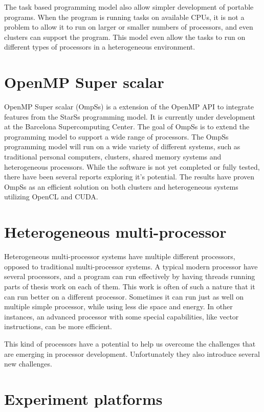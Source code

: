 The task based programming model also allow simpler development of portable programs.
When the program is running tasks on available CPUs, it is not a problem to allow it to run on larger or smaller numbers of processors, and even clusters can support the program.
This model even allow the tasks to run on different types of processors in a heterogeneous environment.

\section[OmpSs]{OpenMP Super scalar}
OpenMP Super scalar (OmpSs) is a extension of the OpenMP API to integrate features from the StarSs programming model.
It is currently under development at the Barcelona Supercomputing Center.
The goal of OmpSs is to extend the programming model to support a wide range of processors.
The OmpSs programming model will run on a wide variety of different systems, such as traditional personal computers, clusters, shared memory systems and heterogeneous processors.
While the software is not yet completed or fully tested, there have been several reports exploring it's potential.
The results have proven OmpSs as an efficient solution on both clusters and heterogeneous systems utilizing OpenCL and CUDA.


\section{Heterogeneous multi-processor}
Heterogeneous multi-processor systems have multiple different processors, opposed to traditional multi-processor systems.
A typical modern processor have several processors, and a program can run effectively by having threads running parts of thesis work on each of them.
This work is often of such a nature that it can run better on a different processor.
Sometimes it can run just as well on multiple simple processor, while using less die space and energy.
In other instances, an advanced processor with some special capabilities, like vector instructions, can be more efficient.

  This kind of processors have a potential to help us overcome the challenges that are emerging in processor development.
    Unfortunately they also introduce several new challenges.

\section{Experiment platforms}


